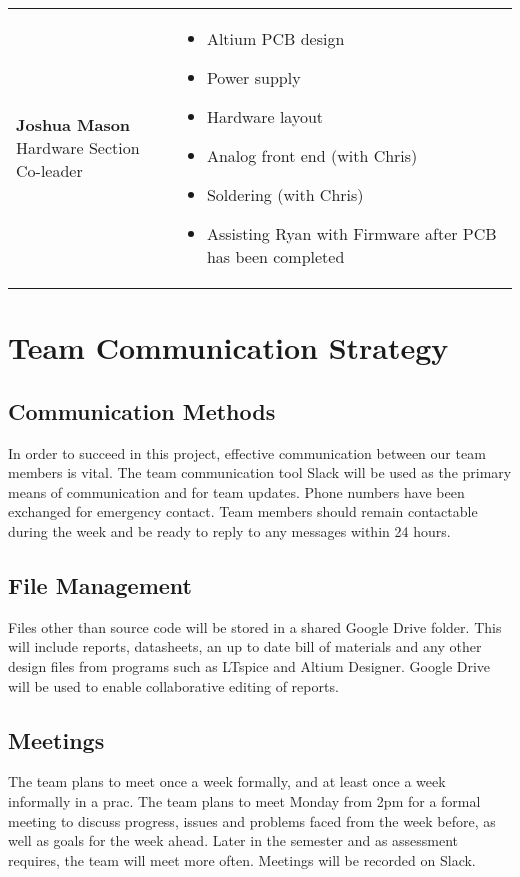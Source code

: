 \documentclass[12pt]{report}
\begin{document}
\begin{tabular}{l p{}}
	\pbox{20cm}{\textbf{Joshua Mason} \\ Hardware Section Co-leader} &
	{\begin{itemize}
		\item Altium PCB design
		\item Power supply
		\item Hardware layout
		\item Analog front end (with Chris)
		\item Soldering (with Chris)
		\item Assisting Ryan with Firmware after PCB has been completed
	\end{itemize}}\\
	
\end{tabular}

\chapter{Team Communication Strategy}
\section{Communication Methods}
In order to succeed in this project, effective communication between our team members is vital. The team communication tool Slack will be used as the primary means of communication and for team updates. Phone numbers have been exchanged for emergency contact. Team members should remain contactable during the week and be ready to reply to any messages within 24 hours.
\section{File Management}
Files other than source code will be stored in a shared Google Drive folder. This will include reports, datasheets, an up to date bill of materials and any other design files from programs such as LTspice and Altium Designer. Google Drive will be used to enable collaborative editing of reports.
\section{Meetings}
The team plans to meet once a week formally, and at least once a week informally in a prac. The team plans to meet Monday from 2pm for a formal meeting to discuss progress, issues and problems faced from the week before, as well as goals for the week ahead. Later in the semester and as assessment requires, the team will meet more often. Meetings will be recorded on Slack.
\end{document}
